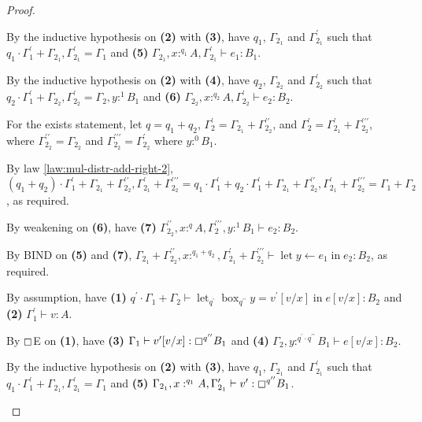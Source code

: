 \documentclass[acmsmall,screen,nonacm]{acmart}
\DeclareMathOperator{\llet}{\text{let}}
\DeclareMathOperator{\lin}{\text{in}}
\DeclareMathOperator{\bbox}{\text{box}}
\newcommand{\tee}{\vdash}
\begin{document}
\begin{proof}
\begin{description}
    By the inductive hypothesis on \textbf{(2)} with \textbf{(3)}, have $q_1$, $\Gamma_{2_1}$ and $\Gamma_{2_1}^\prime$ such that $q_1 \cdot \Gamma_1^\prime + \Gamma_{2_1}, \Gamma_{2_1}^\prime = \Gamma_1$ and \textbf{(5)} $\Gamma_{2_1}, x :^{q_1} A, \Gamma_{2_1}^\prime \tee e_1 : B_1$.
    
    By the inductive hypothesis on \textbf{(2)} with \textbf{(4)}, have $q_2$, $\Gamma_{2_2}$ and $\Gamma_{2_2}^\prime$ such that $q_2 \cdot \Gamma_1^\prime + \Gamma_{2_2}, \Gamma_{2_2}^\prime = \Gamma_2, y :^1 B_1$ and \textbf{(6)} $\Gamma_{2_2}, x :^{q_2} A, \Gamma_{2_2}^\prime \tee e_2 : B_2$.

    For the exists statement, let $q = q_1 + q_2$, $\Gamma_2^\prime = \Gamma_{2_1} + \Gamma_{2_2}^{\prime\prime}$, and $\Gamma_2^\prime = \Gamma_{2_1}^\prime + \Gamma_{2_2}^{\prime\prime\prime}$, where $\Gamma_{2_2}^{\prime\prime} = \Gamma_{2_2}$ and $\Gamma_{2_2}^{\prime\prime\prime} = \Gamma_{2_2}^\prime$ where $y :^0 B_1$.

    By law \ref{law:mul-distr-add-right-2}, $(q_1 + q_2) \cdot \Gamma_1^\prime + \Gamma_{2_1} + \Gamma_{2_2}^{\prime\prime}, \Gamma_{2_1}^\prime + \Gamma_{2_2}^{\prime\prime\prime} = q_1 \cdot \Gamma_1^\prime + q_2 \cdot \Gamma_1^\prime + \Gamma_{2_1} + \Gamma_{2_2}^{\prime\prime}, \Gamma_{2_1}^\prime + \Gamma_{2_2}^{\prime\prime\prime} = \Gamma_1 + \Gamma_2$, as required.
    
    By weakening on \textbf{(6)}, have \textbf{(7)} $\Gamma_{2_2}^{\prime\prime}, x :^q A, \Gamma_2^{\prime\prime\prime}, y :^1 B_1 \tee e_2 : B_2$.

    By BIND on \textbf{(5)} and \textbf{(7)}, $\Gamma_{2_1} + \Gamma_{2_2}^{\prime\prime}, x :^{q_1 + q_2}, \Gamma_{2_1}^\prime + \Gamma_{2_2}^{\prime\prime\prime} \tee \llet y \leftarrow e_1 \lin e_2 : B_2$, as required.
    \\
    \item[Case $\boxempty$E.]
    By assumption, have \textbf{(1)} $q^\prime \cdot \Gamma_1 + \Gamma_2 \tee \llet_{q^\prime} \bbox_{q^{\prime\prime}} y = v^\prime[v/x] \lin e[v/x] : B_2$ and \textbf{(2)} $\Gamma_1^\prime \tee v : A$.
    
    By $\boxempty$E on \textbf{(1)}, have \textbf{(3)} $\Gamma_1 \tee v^\prime[v/x] : \boxempty^{q^{\prime\prime}} B_1$ and \textbf{(4)} $\Gamma_2, y :^{q^\prime \cdot q^{\prime\prime}} B_1 \tee e[v/x] : B_2$.

    By the inductive hypothesis on \textbf{(2)} with \textbf{(3)}, have $q_1$, $\Gamma_{2_1}$ and $\Gamma_{2_1}^\prime$ such that $q_1 \cdot \Gamma_1^\prime + \Gamma_{2_1}, \Gamma_{2_1}^\prime = \Gamma_1$ and \textbf{(5)} $\Gamma_{2_1}, x :^{q_1} A, \Gamma_{2_1}^\prime \tee v^\prime : \boxempty^{q^{\prime\prime}} B_1$.
    

\end{description}
\end{proof}
\end{document}
